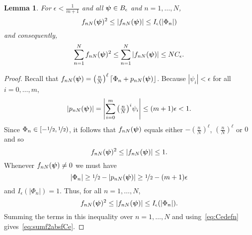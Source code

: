 \documentclass[aap]{imsart}
\newcommand{\abs}[1]{\left\vert #1 \right\vert}
\newcommand{\round}[1]{{\left\lceil #1 \right\rfloor}}
\newtheorem{lemma}{Lemma}
\begin{document}
\begin{lemma}\label{lem:epslmlemma}
For $\epsilon < \frac{1}{m+1}$ and all $\boldsymbol{\psi} \in B_\epsilon$ and $n = 1, \dots, N$,
\[
f_{nN}(\psibf)^2 \leq \abs{f_{nN}(\psibf)} \leq I_\epsilon(\abs{\Phi_n})
\]
and consequently,
\begin{equation}\label{eq:sumf2absfCe}
\sum_{n=1}^{N}f_{nN}(\psibf)^2 \leq \sum_{n=1}^{N}\abs{f_{nN}(\psibf)} \leq N C_\epsilon.
\end{equation}
\end{lemma}
\begin{proof}
Recall that $f_{nN}(\psibf) = \left( \tfrac{n}{N}\right)^\ell \round{\Phi_n + p_{nN}(\psibf)}$.  Because $\abs{\psi_i} < \epsilon$ for all $i = 0, \dots, m$, 
\begin{equation}\label{eq:pnNsmall}
\abs{p_{nN}(\psibf)} = \abs{\sum_{i=0}^{m}\big(\tfrac{n}{N}\big)^i \psi_i} \leq (m+1)\epsilon < 1.
\end{equation}
Since $\Phi_n \in [-\nicefrac{1}{2}, \nicefrac{1}{2})$, it follows that $f_{nN}(\boldsymbol{\psi})$ equals either $-(\tfrac{n}{N})^\ell$, $(\tfrac{n}{N})^\ell$ or $0$ and so
\begin{equation}\label{eq:fnNleqfnNs}
   f_{nN}(\psibf)^2 \leq \abs{f_{nN}(\psibf)} \leq 1.
\end{equation}
Whenever $f_{nN}(\boldsymbol{\psi}) \neq 0$ we must have 
\[
\abs{\Phi_n} \geq \nicefrac{1}{2} - \abs{p_{nN}(\psibf)} \geq \nicefrac{1}{2} - (m+1)\epsilon
\]
and $I_\epsilon(\abs{\Phi_n}) = 1$.  Thus, for all $n = 1, \dots, N$,
\[
f_{nN}(\psibf)^2 \leq \abs{f_{nN}(\psibf)} \leq I_\epsilon(\abs{\Phi_n}). %
\]
Summing the terms in this inequality over $n = 1, \dots, N$ and using~\eqref{eq:Cedefn} gives~\eqref{eq:sumf2absfCe}.
\end{proof}
\end{document}
